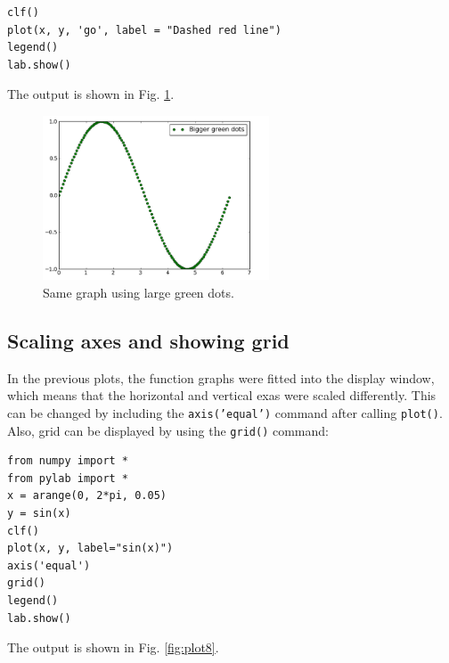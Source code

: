 \begin{verbatim}
clf()
plot(x, y, 'go', label = "Dashed red line")
legend()
lab.show()
\end{verbatim}
\noindent
The output is shown in Fig. \ref{fig:plot5}.
\newpage

\begin{figure}[!ht]
\begin{center}
\includegraphics[width=0.6\textwidth]{imgp/plot5.png}
\end{center}
\vspace{-6mm}
\caption{Same graph using large green dots.}
\label{fig:plot5}
\end{figure}
\noindent

\subsection{Scaling axes and showing grid}

In the previous plots, the function graphs were fitted into the 
display window, which means that the horizontal and vertical 
exas were scaled differently. This can be changed by including the 
{\tt axis('equal')} command after calling {\tt plot()}. Also, 
grid can be displayed by using the {\tt grid()} command:

\begin{verbatim}
from numpy import *
from pylab import *
x = arange(0, 2*pi, 0.05)
y = sin(x)
clf()
plot(x, y, label="sin(x)")
axis('equal')
grid()
legend()
lab.show()
\end{verbatim}
\noindent
The output is shown in Fig. \ref{fig:plot8}.
\newpage

